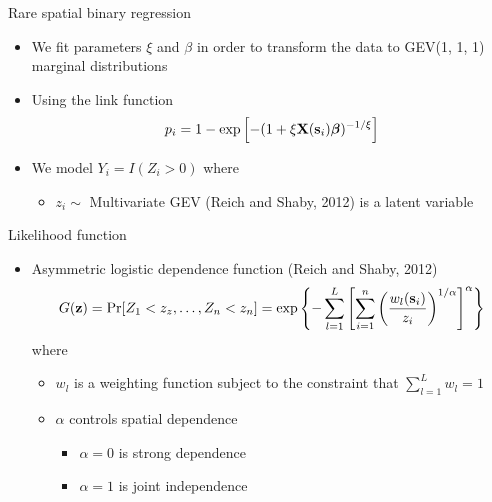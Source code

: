\documentclass{beamer}
\begin{document}
\begin{frame}{Rare spatial binary regression}
  \begin{itemize} \setlength{\itemsep}{0.5em}
    \item We fit parameters $\xi$ and $\beta$ in order to transform the data to GEV(1, 1, 1) marginal distributions
    \item Using the link function
    \begin{align*}
      p_i = 1 - \exp \left[-(1 + \xi \mbox{\bf X}(\mbox{\bf s}_i) \mbox{\boldmath $\beta$})^{-1/\xi}\right]
    \end{align*}
    \item We model $Y_i = I(Z_i > 0)$ where
    \begin{itemize}
      \item $z_i\sim$ Multivariate GEV (Reich and Shaby, 2012) is a latent variable
    \end{itemize}
  \end{itemize}
\end{frame}

\begin{frame}{Likelihood function}
  \begin{itemize} \setlength{\itemsep}{0.5em}
    \item Asymmetric logistic dependence function (Reich and Shaby, 2012)
    \footnotesize{
    \begin{align*}
      G(\mbox{\bf z}) = \Pr[Z_1 < z_z, \ldots, Z_n < z_n] = \exp\left\{ - \sum_{l = 1}^{L} \left[ \sum_{i = 1}^n \left( \frac{ w_l(\mbox{\bf s}_i) }{ z_i } \right)^{ 1 / \alpha} \right]^\alpha \right\}
    \end{align*}
    }
    where
    \begin{itemize}
      \item $w_l$ is a weighting function subject to the constraint that $\sum_{l = 1}^L w_l = 1$
      \item $\alpha$ controls spatial dependence
      \begin{itemize}
        \item $\alpha = 0$ is strong dependence
        \item $\alpha = 1$ is joint independence
      \end{itemize}
    \end{itemize}
  \end{itemize}
\end{frame}
\end{document}
